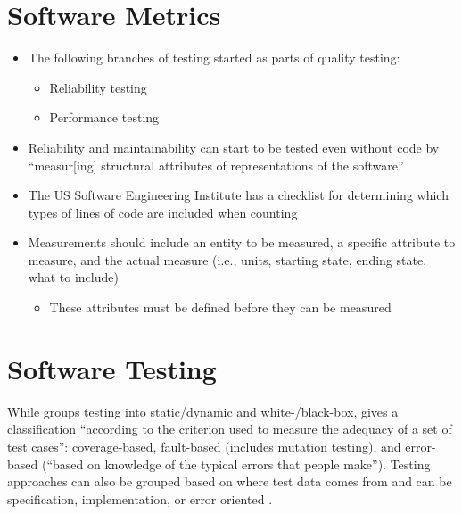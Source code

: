 \section{Software Metrics}
\label{chap:notes:sec:software-metrics}

\begin{itemize}
      \item The following branches of testing started as parts of quality
            testing:
            \begin{itemize}
                  \item Reliability testing \cite[p.~18, ch.~10]{fenton_software_1997}
                  \item Performance testing \cite[p.~18, ch.~7]{fenton_software_1997}
            \end{itemize}
      \item Reliability and maintainability can start to be tested even without
            code by ``measur[ing] structural attributes of representations of the
            software'' \cite[p.~18]{fenton_software_1997}
      \item The US Software Engineering Institute has a checklist for determining
            which types of lines of code are included when counting
            \cite[pp.~30-31]{fenton_software_1997}
      \item Measurements should include an entity to be measured, a specific
            attribute to measure, and the actual measure (i.e., units, starting
            state, ending state, what to include) \cite[p.~36]{fenton_software_1997}
            \begin{itemize}
                  \item These attributes must be defined before they can be
                        measured \cite[p.~38]{fenton_software_1997}
            \end{itemize}
\end{itemize}

\section{Software Testing}
\label{chap:notes:sec:software-testing}

While \cite{patton_software_2006} groups testing into static/dynamic and
white-/black-box, \cite[p.~398-399]{van_vliet_software_2000} gives a
classification ``according to the criterion used to measure the adequacy of a
set of test cases'': coverage-based, fault-based (includes mutation testing),
and error-based (``based on knowledge of the typical errors that people make'').
Testing approaches can also be grouped based on where test data comes from and
can be specification, implementation, or error oriented
\cite[p.~440]{peters_software_2000}.


